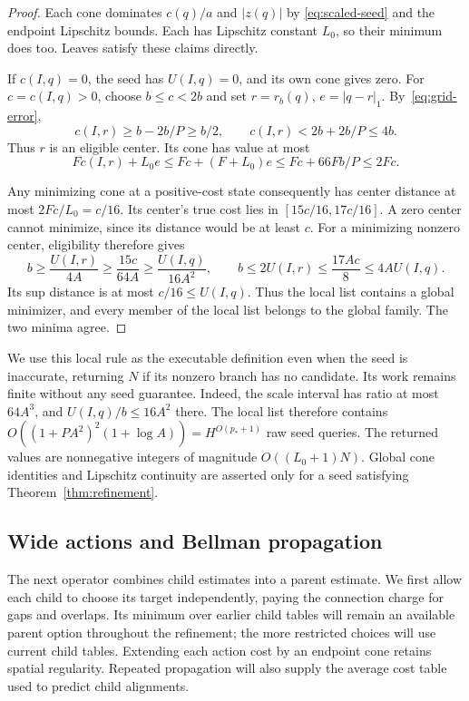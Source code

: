 \begin{proof}
Each cone dominates $c(q)/a$ and $|z(q)|$ by
\eqref{eq:scaled-seed} and the endpoint Lipschitz bounds.  Each has
Lipschitz constant $L_0$, so their minimum does too.  Leaves satisfy
these claims directly.

If $c(I,q)=0$, the seed has $U(I,q)=0$, and its own cone gives zero.
For $c=c(I,q)>0$, choose $b\le c<2b$ and set $r=r_b(q)$,
$e=|q-r|_1$.  By~\eqref{eq:grid-error},
\[
 c(I,r)\ge b-2b/P\ge b/2,
 \qquad c(I,r)<2b+2b/P\le4b.
\]
Thus $r$ is an eligible center.  Its cone has value at most
\[
 Fc(I,r)+L_0e
 \le Fc+(F+L_0)e
 \le Fc+66Fb/P\le2Fc.
\]

Any minimizing cone at a positive-cost state consequently has center
distance at most $2Fc/L_0=c/16$.  Its center's true cost lies in
$[15c/16,17c/16]$.  A zero center cannot minimize, since its distance
would be at least $c$.  For a minimizing nonzero center, eligibility
therefore gives
\[
 b\ge \frac{U(I,r)}{4A}
   \ge\frac{15c}{64A}\ge\frac{U(I,q)}{16A^2},
 \qquad
 b\le2U(I,r)\le\frac{17Ac}{8}\le4AU(I,q).
\]
Its sup distance is at most $c/16\le U(I,q)$.  Thus the local list
contains a global minimizer, and every member of the local list belongs
to the global family.  The two minima agree.
\end{proof}

We use this local rule as the executable definition even when the seed
is inaccurate, returning $N$ if its nonzero branch has no candidate.
Its work remains finite without any seed guarantee.  Indeed, the scale
interval has ratio at most $64A^3$, and $U(I,q)/b\le16A^2$ there.
The local list therefore contains
$O((1+PA^2)^2(1+\log A))=H^{O(p_*+1)}$ raw seed queries.
The returned values are nonnegative integers of magnitude
$O((L_0+1)N)$.  Global cone identities and Lipschitz continuity are
asserted only for a seed satisfying Theorem~\ref{thm:refinement}.

\subsection{Wide actions and Bellman propagation}

The next operator combines child estimates into a parent estimate. We
first allow each child to choose its target independently, paying the
connection charge for gaps and overlaps. Its minimum over earlier child
tables will remain an available parent option throughout the refinement;
the more restricted choices will use current child tables. Extending
each action cost by an endpoint cone retains spatial
regularity. Repeated propagation will also supply the average cost table
used to predict child alignments.

